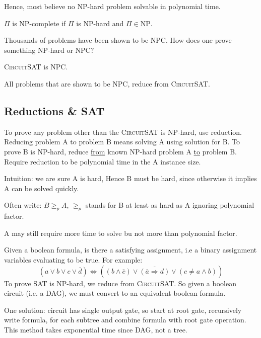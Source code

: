 Hence, most believe no NP-hard problem solvable in polynomial time.

$\Pi$ is NP-complete if $\Pi$ is NP-hard and $\Pi \in \text{NP}$.

Thousands of problems have been shown to be NPC.
How does one prove something NP-hard or NPC?

\begin{theorem} \textsc{CircuitSAT} is NPC.\end{theorem}

All problems that are shown to be NPC, reduce from \textsc{CircuitSAT}.

\subsection{Reductions \& SAT}
To prove any problem other than the \textsc{CircuitSAT} is NP-hard, use reduction.
Reducing problem A to problem B means solving A using solution for B.
To prove B is NP-hard, reduce \underline{from} known NP-hard problem A \underline{to} problem B.
Require reduction to be polynomial time in the A instance size.

Intuition: we are sure A is hard, Hence B must be hard, since otherwise it implies A can be
solved quickly.

Often write: $B \geq_p A$,
$\geq_p$ stands for B at least as hard as A ignoring polynomial factor.

A may still require more time to solve bu not more than polynomial factor.

Given a boolean formula, is there a satisfying assignment,
i.e a binary assignment variables evaluating to be true.
For example: 
\[(a \lor b \lor c \lor \overline{d}) \Longleftrightarrow ((b \land \overline{c}) \lor \overline{(\overline{a} \Rightarrow d)} \lor (c \neq a \land b))\]
To prove SAT is NP-hard, we reduce from \textsc{CircuitSAT}.
So given a boolean circuit (i.e. a DAG), we must convert to an equivalent boolean formula.

One solution: circuit has single output gate,
so start at root gate, recursively write formula,
for each subtree and combine formula with root gate operation.
This method takes exponential time since DAG, not a tree.

